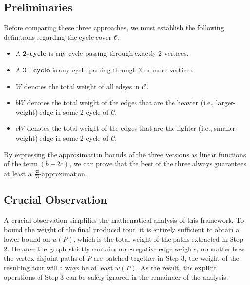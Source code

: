 \subsection{Preliminaries}
Before comparing these three approaches, we must establish the following
definitions regarding the cycle cover $\mathcal{C}$:
\begin{itemize}
    \item A \textbf{2-cycle} is any cycle passing through exactly 2 vertices.
    \item A \textbf{$3^+$-cycle} is any cycle passing through 3 or more
    vertices.
    \item $W$ denotes the total weight of all edges in $\mathcal{C}$.
    \item $bW$ denotes the total weight of the edges that are the heavier (i.e.,
    larger-weight) edge in some 2-cycle of $\mathcal{C}$.
    \item $cW$ denotes the total weight of the edges that are the lighter (i.e.,
    smaller-weight) edge in some 2-cycle of $\mathcal{C}$.
\end{itemize}

By expressing the approximation bounds of the three versions as linear functions
of the term $(b - 2c)$, we can prove that the best of the three always
guarantees at least a $\frac{38}{63}$-approximation.

\subsection{Crucial Observation}
A crucial observation simplifies the mathematical analysis of this framework. To
bound the weight of the final produced tour, it is entirely sufficient to obtain
a lower bound on $w(P)$, which is the total weight of the paths extracted in
Step 2. Because the graph strictly contains non-negative edge weights, no matter
how the vertex-disjoint paths of $P$ are patched together in Step 3, the weight
of the resulting tour will always be at least $w(P)$. As the result, the
explicit operations of Step 3 can be safely ignored in the remainder of the
analysis.
